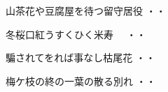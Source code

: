 \vspace{0.6cm}
\begin{shiika}山茶花や豆腐屋を待つ留守居役
\hfill{・・}\end{shiika}
\vspace{0.6cm}
\begin{shiika}冬桜口紅うすくひく米寿　
\hfill{・・}\end{shiika}
\vspace{0.6cm}
\begin{shiika}騙されてをれば事なし枯尾花
\hfill{・・}\end{shiika}
\vspace{0.6cm}
\begin{shiika}梅ケ枝の終の一葉の散る別れ
\hfill{・・}\end{shiika}
\endinput
\vspace{0.6cm}
\begin{shiika}いつまでも御元気でねてふ賀状の数　
\hfill{\rensuji*{8}・\rensuji*{0}・\rensuji*{0}}\end{shiika}
\vspace{0.6cm}
\begin{shiika}退職と一筆添へし賀状かな　　　　　
\hfill{\rensuji*{8}・\rensuji*{0}・\rensuji*{0}}\end{shiika}
\vspace{0.6cm}
\begin{shiika}初入日三六六の一を呑み
\hfill{\rensuji*{8}・\rensuji*{0}・\rensuji*{0}}\end{shiika}
\vspace{0.6cm}
\begin{shiika}ページくる吾が音寒し影寒し
\hfill{\rensuji*{8}・\rensuji*{0}・\rensuji*{0}}\end{shiika}
\vspace{0.6cm}
\begin{shiika}小豆粥老ひてすこやか姉弟
\hfill{\rensuji*{8}・\rensuji*{0}・\rensuji*{0}}\end{shiika}
\vspace{0.6cm}
\begin{shiika}春寒し言はでききをり二度話　　　　
\hfill{\rensuji*{8}・\rensuji*{0}・\rensuji*{0}}\end{shiika}
\vspace{0.6cm}
\begin{shiika}鳥は雲に二度行くスーパー買いわすれ　
\hfill{\rensuji*{8}・\rensuji*{0}・\rensuji*{0}}\end{shiika}
